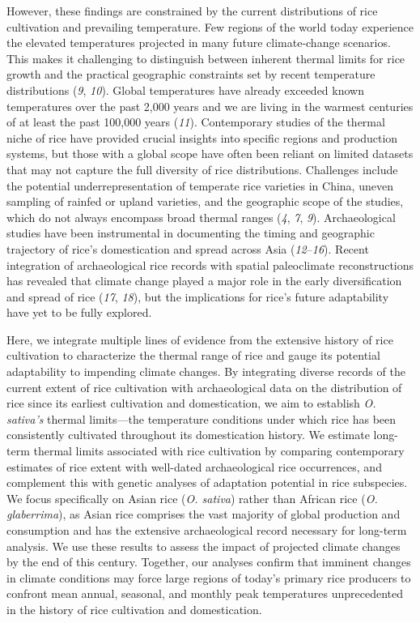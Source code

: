 \documentclass[
  letterpaper,
  DIV=11,
  numbers=noendperiod]{scrartcl}
\begin{document}
However, these findings are constrained by the current distributions of
rice cultivation and prevailing temperature. Few regions of the world
today experience the elevated temperatures projected in many future
climate-change scenarios. This makes it challenging to distinguish
between inherent thermal limits for rice growth and the practical
geographic constraints set by recent temperature distributions
(\emph{9}, \emph{10}). Global temperatures have already exceeded known
temperatures over the past 2,000 years and we are living in the warmest
centuries of at least the past 100,000 years (\emph{11}). Contemporary
studies of the thermal niche of rice have provided crucial insights into
specific regions and production systems, but those with a global scope
have often been reliant on limited datasets that may not capture the
full diversity of rice distributions. Challenges include the potential
underrepresentation of temperate rice varieties in China, uneven
sampling of rainfed or upland varieties, and the geographic scope of the
studies, which do not always encompass broad thermal ranges (\emph{4},
\emph{7}, \emph{9}). Archaeological studies have been instrumental in
documenting the timing and geographic trajectory of rice's domestication
and spread across Asia (\emph{12}--\emph{16}). Recent integration of
archaeological rice records with spatial paleoclimate reconstructions
has revealed that climate change played a major role in the early
diversification and spread of rice (\emph{17}, \emph{18}), but the
implications for rice's future adaptability have yet to be fully
explored.

Here, we integrate multiple lines of evidence from the extensive history
of rice cultivation to characterize the thermal range of rice and gauge
its potential adaptability to impending climate changes. By integrating
diverse records of the current extent of rice cultivation with
archaeological data on the distribution of rice since its earliest
cultivation and domestication, we aim to establish \emph{O. sativa's}
thermal limits---the temperature conditions under which rice has been
consistently cultivated throughout its domestication history. We
estimate long-term thermal limits associated with rice cultivation by
comparing contemporary estimates of rice extent with well-dated
archaeological rice occurrences, and complement this with genetic
analyses of adaptation potential in rice subspecies. We focus
specifically on Asian rice (\emph{O. sativa}) rather than African rice
(\emph{O. glaberrima}), as Asian rice comprises the vast majority of
global production and consumption and has the extensive archaeological
record necessary for long-term analysis. We use these results to assess
the impact of projected climate changes by the end of this century.
Together, our analyses confirm that imminent changes in climate
conditions may force large regions of today's primary rice producers to
confront mean annual, seasonal, and monthly peak temperatures
unprecedented in the history of rice cultivation and domestication.
\end{document}
